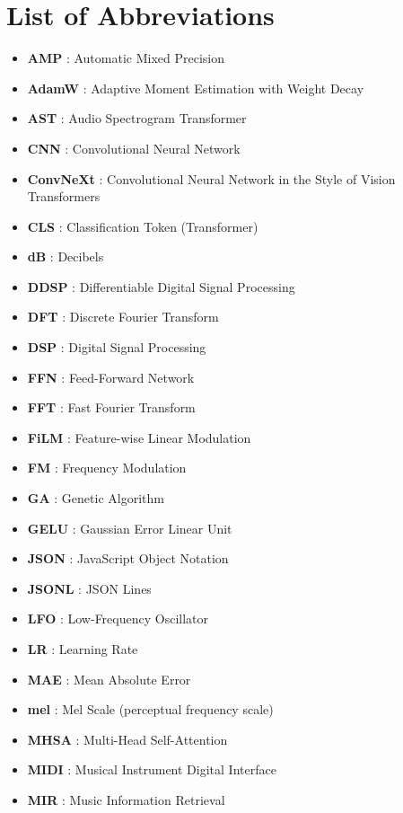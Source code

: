 \section*{List of Abbreviations}

\begin{itemize}
    \item \textbf{AMP} : Automatic Mixed Precision
    \item \textbf{AdamW} : Adaptive Moment Estimation with Weight Decay
    \item \textbf{AST} : Audio Spectrogram Transformer
    \item \textbf{CNN} : Convolutional Neural Network
    \item \textbf{ConvNeXt} : Convolutional Neural Network in the Style of Vision Transformers
    \item \textbf{CLS} : Classification Token (Transformer)
    \item \textbf{dB} : Decibels
    \item \textbf{DDSP} : Differentiable Digital Signal Processing
    \item \textbf{DFT} : Discrete Fourier Transform
    \item \textbf{DSP} : Digital Signal Processing
    \item \textbf{FFN} : Feed-Forward Network
    \item \textbf{FFT} : Fast Fourier Transform
    \item \textbf{FiLM} : Feature-wise Linear Modulation
    \item \textbf{FM} : Frequency Modulation
    \item \textbf{GA} : Genetic Algorithm
    \item \textbf{GELU} : Gaussian Error Linear Unit
    \item \textbf{JSON} : JavaScript Object Notation
    \item \textbf{JSONL} : JSON Lines
    \item \textbf{LFO} : Low-Frequency Oscillator
    \item \textbf{LR} : Learning Rate
    \item \textbf{MAE} : Mean Absolute Error
    \item \textbf{mel} : Mel Scale (perceptual frequency scale)
    \item \textbf{MHSA} : Multi-Head Self-Attention
    \item \textbf{MIDI} : Musical Instrument Digital Interface
    \item \textbf{MIR} : Music Information Retrieval

\end{itemize}
